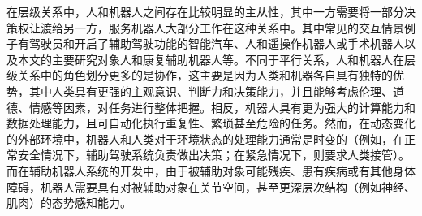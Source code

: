 在层级关系中，人和机器人之间存在比较明显的主从性，其中一方需要将一部分决策权让渡给另一方，服务机器人大部分工作在这种关系中。其中常见的交互情景例子有驾驶员和开启了辅助驾驶功能的智能汽车、人和遥操作机器人或手术机器人以及本文的主要研究对象人和康复辅助机器人等。不同于平行关系，人和机器人在层级关系中的角色划分更多的是协作，这主要是因为人类和机器各自具有独特的优势，其中人类具有更强的主观意识、判断力和决策能力，并且能够考虑伦理、道德、情感等因素，对任务进行整体把握。相反，机器人具有更为强大的计算能力和数据处理能力，且可自动化执行重复性、繁琐甚至危险的任务。然而，在动态变化的外部环境中，机器人和人类对于环境状态的处理能力通常是时变的（例如，在正常安全情况下，辅助驾驶系统负责做出决策；在紧急情况下，则要求人类接管）。而在辅助机器人系统的开发中，由于被辅助对象可能残疾、患有疾病或有其他身体障碍，机器人需要具有对被辅助对象在关节空间，甚至更深层次结构（例如神经、肌肉）的态势感知能力。

